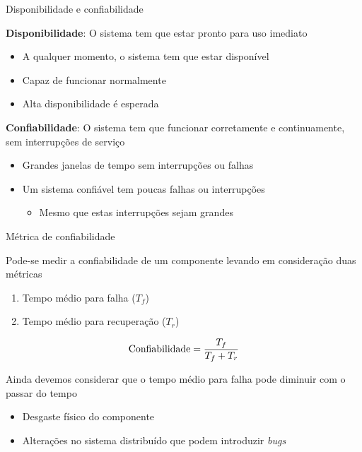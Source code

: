 \documentclass[compress]{beamer}
\begin{document}

\begin{frame}{Disponibilidade e confiabilidade}

\textbf{Disponibilidade}: O sistema tem que estar pronto para uso imediato
\begin{itemize}
    \item A qualquer momento, o sistema tem que estar disponível
    \item Capaz de funcionar normalmente
    \item Alta disponibilidade é esperada
\end{itemize}

\vspace{0.5cm}

\textbf{Confiabilidade}: O sistema tem que funcionar corretamente e continuamente, sem interrupções de serviço
\begin{itemize}
    \item Grandes janelas de tempo sem interrupções ou falhas
    \item Um sistema confiável tem poucas falhas ou interrupções
    \begin{itemize}
        \item Mesmo que estas interrupções sejam grandes
    \end{itemize}
\end{itemize}
\end{frame}


\begin{frame}{Métrica de confiabilidade}

Pode-se medir a confiabilidade de um componente levando em consideração duas métricas
\begin{enumerate}
    \item Tempo médio para falha ($T_f$)
    \item Tempo médio para recuperação ($T_r$)
\end{enumerate}

\vspace{0.5cm}

$$
\textnormal{Confiabilidade} = \frac{T_f}{T_f + T_r}
$$

\vspace{0.5cm}

Ainda devemos considerar que o tempo médio para falha pode diminuir com o passar do tempo
\begin{itemize}
    \item Desgaste físico do componente
    \item Alterações no sistema distribuído que podem introduzir \textit{bugs}
\end{itemize}
\end{frame}
\end{document}
